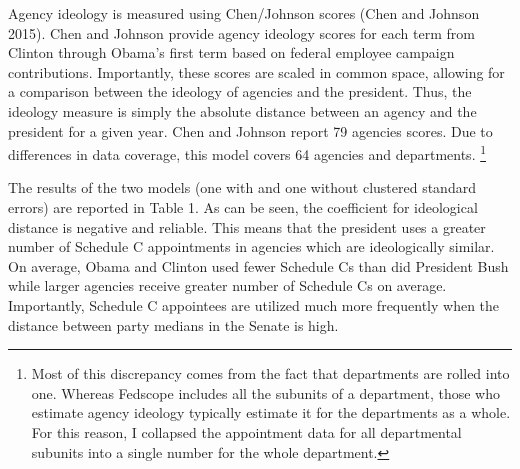 \documentclass[12pt]{article}
\begin{document}
Agency ideology is measured using Chen/Johnson scores (Chen and Johnson 2015). Chen and Johnson provide agency ideology scores for each term from Clinton through Obama's first term based on federal employee campaign contributions. Importantly, these scores are scaled in common space, allowing for a comparison between the ideology of agencies and the president. Thus, the ideology measure is simply the absolute distance between an agency and the president for a given year. Chen and Johnson report 79 agencies scores. Due to differences in data coverage, this model covers 64 agencies and departments. \footnote{Most of this discrepancy comes from the fact that departments are rolled into one. Whereas Fedscope includes all the subunits of a department, those who estimate agency ideology typically estimate it for the departments as a whole. For this reason, I collapsed the appointment data for all departmental subunits into a single number for the whole department.}

The results of the two models (one with and one without clustered standard errors) are reported in Table 1. As can be seen, the coefficient for ideological distance is negative and reliable. This means that the president uses a greater number of Schedule C appointments in agencies which are ideologically similar. On average, Obama and Clinton used fewer Schedule Cs than did President Bush while larger agencies receive greater number of Schedule Cs on average. Importantly, Schedule C appointees are utilized much more frequently when the distance between party medians in the Senate is high. 
\end{document}
